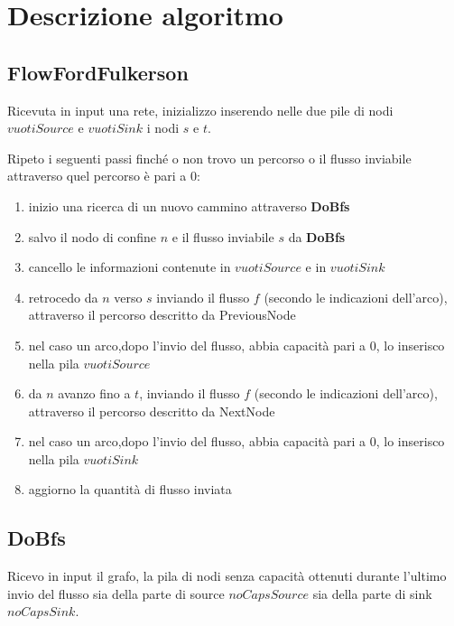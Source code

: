 \documentclass{article}
\begin{document}
\section{Descrizione algoritmo}

\subsection{FlowFordFulkerson}
Ricevuta in input una rete, inizializzo inserendo nelle due pile di nodi $vuotiSource$ e $vuotiSink$ i nodi $s$ e $t$.

Ripeto i seguenti passi finché o non trovo un percorso o il flusso inviabile attraverso quel percorso è pari a 0:
\begin{enumerate}
    \item inizio una ricerca di un nuovo cammino attraverso \textbf{DoBfs}
    \item salvo il nodo di confine $n$ e il flusso inviabile $s$ da \textbf{DoBfs}
    \item cancello le informazioni contenute in $vuotiSource$ e in $vuotiSink$
    \item retrocedo da $n$ verso $s$ inviando il flusso $f$ (secondo le indicazioni dell'arco), attraverso il percorso descritto da PreviousNode
    \item nel caso un arco,dopo l'invio del flusso, abbia capacità pari a 0, lo inserisco nella pila $vuotiSource$
    \item da $n$ avanzo fino a $t$, inviando il flusso $f$ (secondo le indicazioni dell'arco), attraverso il percorso descritto da NextNode
    \item nel caso un arco,dopo l'invio del flusso, abbia capacità pari a 0, lo inserisco nella pila $vuotiSink$
    \item aggiorno la quantità di flusso inviata
\end{enumerate}

\subsection{DoBfs}
Ricevo in input il grafo, la pila di nodi senza capacità ottenuti durante l'ultimo invio del flusso sia della parte di source $noCapsSource$ sia della parte di sink $noCapsSink$.
\end{document}
